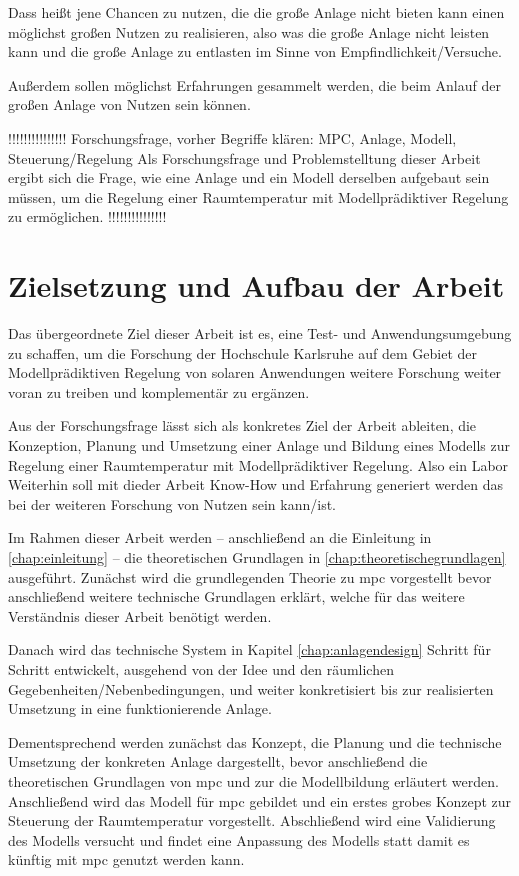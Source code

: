 Dass heißt jene Chancen zu nutzen, die die große Anlage nicht bieten kann einen möglichst großen Nutzen zu realisieren, also was die große Anlage nicht leisten kann und die große Anlage zu entlasten im Sinne von Empfindlichkeit/Versuche.

Außerdem sollen möglichst Erfahrungen gesammelt werden, die beim Anlauf der großen Anlage von Nutzen sein können.


!!!!!!!!!!!!!!! Forschungsfrage, vorher Begriffe klären: MPC, Anlage, Modell, Steuerung/Regelung
Als Forschungsfrage und Problemstelltung dieser Arbeit ergibt sich die Frage, wie eine Anlage und ein Modell derselben aufgebaut sein müssen, um die Regelung einer Raumtemperatur mit Modellprädiktiver Regelung zu ermöglichen.
!!!!!!!!!!!!!!!

\section{Zielsetzung und Aufbau der Arbeit}
\label{sec:ziel}

Das übergeordnete Ziel dieser Arbeit ist es, eine Test- und Anwendungsumgebung zu schaffen, um die Forschung der Hochschule Karlsruhe auf dem Gebiet der Modellprädiktiven Regelung von solaren Anwendungen weitere Forschung weiter voran zu treiben und komplementär zu ergänzen.

Aus der Forschungsfrage lässt sich als konkretes Ziel der Arbeit ableiten, die Konzeption, Planung und Umsetzung einer Anlage und Bildung eines Modells zur Regelung einer Raumtemperatur mit Modellprädiktiver Regelung.
Also ein Labor
Weiterhin soll mit dieder Arbeit Know-How und Erfahrung generiert werden das bei der weiteren Forschung von Nutzen sein kann/ist.


Im Rahmen dieser Arbeit werden -- anschließend an die Einleitung in \ref{chap:einleitung} -- die theoretischen Grundlagen in \ref{chap:theoretischegrundlagen} ausgeführt. Zunächst wird die grundlegenden Theorie zu \acrlong{mpc} vorgestellt bevor anschließend weitere technische Grundlagen erklärt, welche für das weitere Verständnis dieser Arbeit benötigt werden. 


Danach wird das technische System in Kapitel \ref{chap:anlagendesign} Schritt für Schritt entwickelt, ausgehend von der Idee und den räumlichen Gegebenheiten/Nebenbedingungen, und weiter konkretisiert bis zur realisierten Umsetzung in eine funktionierende Anlage.



Dementsprechend werden zunächst das Konzept, die Planung und die technische Umsetzung der konkreten Anlage dargestellt, bevor anschließend die theoretischen Grundlagen von \acrlong{mpc} und zur die Modellbildung erläutert werden. Anschließend wird das Modell für \acrlong{mpc} gebildet und ein erstes grobes Konzept zur Steuerung der Raumtemperatur vorgestellt. Abschließend wird eine Validierung des Modells versucht und findet eine Anpassung des Modells statt damit es künftig mit \acrlong{mpc} genutzt werden kann.